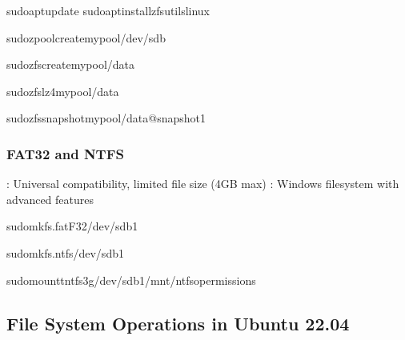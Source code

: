 \documentclass[letterpaper,10pt,english]{sphinxmanual}
\begin{document}
\begin{sphinxVerbatim}[commandchars=\\\{\}]
sudoaptupdate
sudoaptinstallzfsutils\PYGZhy{}linux

sudozpoolcreatemypool/dev/sdb

sudozfscreatemypool/data

sudozfslz4mypool/data

sudozfssnapshotmypool/data@snapshot1
\end{sphinxVerbatim}


\subsubsection{FAT32 and NTFS}
\label{\detokenize{file-systems:fat32-and-ntfs}}
\sphinxAtStartPar
{}: Universal compatibility, limited file size (4GB max)
: Windows filesystem with advanced features

\begin{sphinxVerbatim}[commandchars=\\\{\}]
sudomkfs.fat\PYGZhy{}F32/dev/sdb1

sudomkfs.ntfs/dev/sdb1

sudomount\PYGZhy{}tntfs\PYGZhy{}3g/dev/sdb1/mnt/ntfs\PYGZhy{}opermissions
\end{sphinxVerbatim}


\subsection{File System Operations in Ubuntu 22.04}
\label{\detokenize{file-systems:file-system-operations-in-ubuntu-22-04}}
\end{document}
